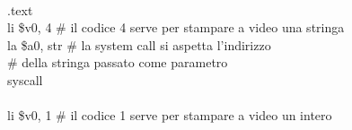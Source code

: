 \documentclass[../main.tex]{subfiles}
\begin{document}
{    \\
    .text \\
    \hspace*{0cm} \hspace*{0cm} \hspace*{0cm} \hspace*{0cm} li \$v0, 4 \hspace*{0cm} \hspace*{0cm} \hspace*{0cm} \# il codice 4 serve per stampare a video una stringa \\
    \hspace*{0cm} \hspace*{0cm} \hspace*{0cm} \hspace*{0cm} la \$a0, str \hspace*{0cm} \# la system call si aspetta l'indirizzo \\
    \hspace*{0cm} \hspace*{0cm} \hspace*{0cm} \hspace*{0cm} \hspace*{0cm} \hspace*{0cm} \hspace*{0cm} \hspace*{0cm} \hspace*{0cm} \hspace*{0cm} \hspace*{0cm} \hspace*{0cm} \hspace*{0cm} \hspace*{0cm} \hspace*{0cm} \hspace*{0cm} \hspace*{0cm} \# della stringa passato come parametro \\
    \hspace*{0cm} \hspace*{0cm} \hspace*{0cm} \hspace*{0cm} syscall \\
    \\
    \hspace*{0cm} \hspace*{0cm} \hspace*{0cm} \hspace*{0cm} li \$v0, 1 \hspace*{0cm} \hspace*{0cm} \hspace*{0cm} \# il codice 1 serve per stampare a video un intero \\
}
\end{document}
